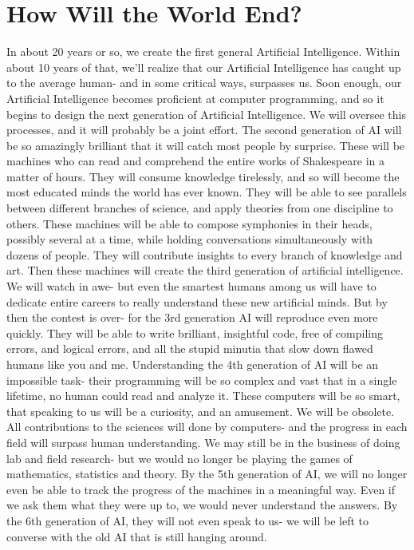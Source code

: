 \documentclass[a4paper]{article}
\begin{document}
\section{How Will the World End?}
In about 20 years or so, we create the first general Artificial Intelligence. Within about 10 years of that, we'll realize that our Artificial Intelligence has caught up to the average human- and in some critical ways, surpasses us.
Soon enough, our Artificial Intelligence becomes proficient at computer programming, and so it begins to design the next generation of Artificial Intelligence. We will oversee this processes, and it will probably be a joint effort.
The second generation of AI will be so amazingly brilliant that it will catch most people by surprise. These will be machines who can read and comprehend the entire works of Shakespeare in a matter of hours. They will consume knowledge tirelessly, and so will become the most educated minds the world has ever known. They will be able to see parallels between different branches of science, and apply theories from one discipline to others.
These machines will be able to compose symphonies in their heads, possibly several at a time, while holding conversations simultaneously with dozens of people. They will contribute insights to every branch of knowledge and art.
Then these machines will create the third generation of artificial intelligence. We will watch in awe- but even the smartest humans among us will have to dedicate entire careers to really understand these new artificial minds.
But by then the contest is over- for the 3rd generation AI will reproduce even more quickly. They will be able to write brilliant, insightful code, free of compiling errors, and logical errors, and all the stupid minutia that slow down flawed humans like you and me.
Understanding the 4th generation of AI will be an impossible task- their programming will be so complex and vast that in a single lifetime, no human could read and analyze it.
These computers will be so smart, that speaking to us will be a curiosity, and an amusement. We will be obsolete. All contributions to the sciences will done by computers- and the progress in each field will surpass human understanding. We may still be in the business of doing lab and field research- but we would no longer be playing the games of mathematics, statistics and theory.
By the 5th generation of AI, we will no longer even be able to track the progress of the machines in a meaningful way. Even if we ask them what they were up to, we would never understand the answers.
By the 6th generation of AI, they will not even speak to us- we will be left to converse with the old AI that is still hanging around.
\end{document}
